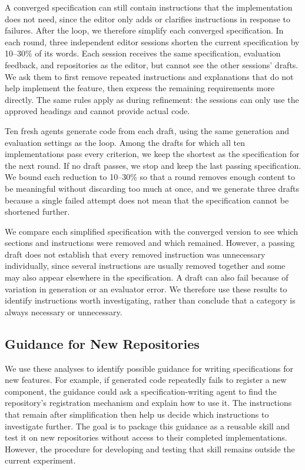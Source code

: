 \documentclass[sigconf,nonacm]{acmart}
\begin{document}
A converged specification can still contain instructions that the implementation does not need, since the editor only adds or clarifies instructions in response to failures. After the loop, we therefore simplify each converged specification. In each round, three independent editor sessions shorten the current specification by 10--30\% of its words. Each session receives the same specification, evaluation feedback, and repositories as the editor, but cannot see the other sessions' drafts. We ask them to first remove repeated instructions and explanations that do not help implement the feature, then express the remaining requirements more directly. The same rules apply as during refinement: the sessions can only use the approved headings and cannot provide actual code.

Ten fresh agents generate code from each draft, using the same generation and evaluation settings as the loop. Among the drafts for which all ten implementations pass every criterion, we keep the shortest as the specification for the next round. If no draft passes, we stop and keep the last passing specification. We bound each reduction to 10--30\% so that a round removes enough content to be meaningful without discarding too much at once, and we generate three drafts because a single failed attempt does not mean that the specification cannot be shortened further.

We compare each simplified specification with the converged version to see which sections and instructions were removed and which remained. However, a passing draft does not establish that every removed instruction was unnecessary individually, since several instructions are usually removed together and some may also appear elsewhere in the specification. A draft can also fail because of variation in generation or an evaluator error. We therefore use these results to identify instructions worth investigating, rather than conclude that a category is always necessary or unnecessary.

\subsection{Guidance for New Repositories}

We use these analyses to identify possible guidance for writing specifications for new features. For example, if generated code repeatedly fails to register a new component, the guidance could ask a specification-writing agent to find the repository's registration mechanism and explain how to use it. The instructions that remain after simplification then help us decide which instructions to investigate further. The goal is to package this guidance as a reusable skill and test it on new repositories without access to their completed implementations. However, the procedure for developing and testing that skill remains outside the current experiment.
\end{document}
